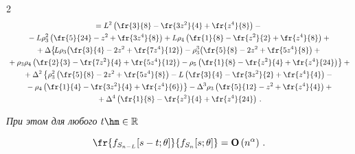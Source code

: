 \begin{multicols}{2}
\begin{multline*}
  =L^2\left(\fr{3}{8}-\fr{3 z^2}{4}+\fr{z^4}{8}\right)


  -{}\\


  {}- L\rho_3^2\left(\fr{5}{24}-z^2+\fr{3 z^4}{8}\right)+L\rho_4\left(\fr{1}{8}-\fr{z^2}{2}+\fr{z^4}{8}\right)


   +{}\\


   {}+\Delta \!\left\{\!L\rho_3\!\left(\fr{3}{4}-2 z^2+\fr{7z^4}{12}\right)


   -\rho_3^3\!\left(\fr{5}{8}-2 z^2+\fr{5 z^4}{8}\right)


   +{}\right.


\\


   \left.


  {} +\rho_3\rho_4\left(\fr{2}{3}-\fr{7z^2}{4}+\fr{5z^4}{12}\right)


   -\rho_5\left(\fr{1}{8}-\fr{z^2}{4}+\fr{z^4}{24}\right)\right\}+{}


\\


  {}   +\Delta^2 \left\{


    \rho_3^2\left(\fr{5}{8}-2z^2+\fr{5z^4}{8}\right)


   -L\left(\fr{3}{4}-\fr{3z^2}{2}+\fr{z^4}{4}\right)


   -{}\right.\\


\left.   {}-\rho_4\left(\fr{1}{4}-\fr{3z^2}{4}+\fr{z^4}{6}\right)\right\}-\Delta^3 \rho_3\left(\fr{5}{12}-z^2+\fr{z^4}{4}\right)+{}\\


{}+


    \Delta^4\left(\fr{1}{8}-\fr{z^2}{4}+\fr{z^4}{24}\right)\,.


  \end{multline*}


\textit{При этом для любого} $t\hm\in\mathbb{R}$


  \begin{equation}


\fr{f_{S_{n-L}}[s-t;\theta]}{f_{S_n}[s;\theta]}


  =\Op\left(n^{\alpha} \right)\,.


 \label{T:6.1-2}


 \end{equation}





 \Do



\end{multicols}
